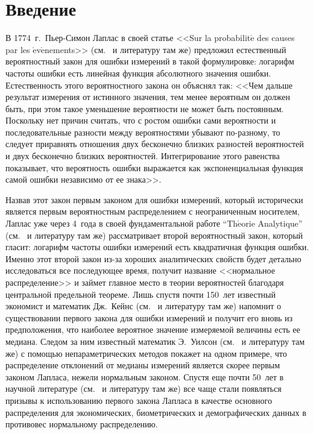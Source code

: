       \begin{multicols}{2}

      \label{st\stat}

\section{Введение}

В 1774~г.\ Пьер-Симон Лаплас в своей статье <<Sur la
probabilit$\acute{\mbox{e}}$ des causes par les $\acute{\mbox{e}}$v$\acute{\mbox{e}}$nements>>
(см.~\cite{10ben} и литературу там же) предложил естественный вероятностный
закон для ошибки измерений в такой формулировке: логарифм частоты ошибки
есть линейная функция абсолютного значения ошибки. Естественность
этого вероятностного закона он объяснял так: <<Чем
дальше результат измерения от истинного значения, тем менее
вероятным он должен быть, при этом такое уменьшение вероятности не
может быть постоянным. Поскольку нет причин считать, что с ростом
ошибки сами вероятности и последовательные разности между
вероятностями убывают по-разному, то следует приравнять отношения
двух бесконечно близких разностей вероятностей и двух бесконечно
близких вероятностей. Интегрирование этого равенства показывает, что
вероятность ошибки выражается как экспоненциальная функция самой
ошибки независимо от ее знака>>. 

Назвав этот закон
первым законом для ошибки измерений, который исторически является
первым вероятностным распределением с неограниченным носителем,
Лаплас уже через 4~года в своей фундаментальной работе
``Th$\acute{\mbox{e}}$orie Analytique'' (см.~\cite{10ben} и
литературу там же) рассматривает второй вероятностный закон, который
гласит: логарифм частоты ошибки измерений есть квадратичная функция
ошибки. Именно этот второй закон из-за хороших аналитических свойств
будет детально исследоваться все последующее время, получит название
<<нормальное распределение>> и займет
главное мес\-то в теории вероятностей благодаря центральной предельной
теореме. Лишь спус\-тя почти 150~лет известный экономист и математик
Дж.~Кейнс (см.~\cite{10ben} и литературу там же) напомнит о существовании
первого закона для ошибки измерений и получит его вновь из
предположения, что наиболее вероятное значение измеряемой величины
есть ее медиана. Следом за ним известный математик Э.~Уилсон (см.~\cite{10ben}
и литературу там же) с помощью непараметрических методов покажет
на одном примере, что распределение отклонений от медианы измерений
является скорее первым законом Лапласа, нежели нормальным законом.
Спустя еще почти 50~лет в научной литературе (см.~\cite{10ben} и литературу
там же) все чаще стали появляться призывы к использованию первого
закона Лапласа в качестве основного распределения для экономических,
биометрических и демографических данных в противовес нормальному
распределению. 


\end{multicols}
